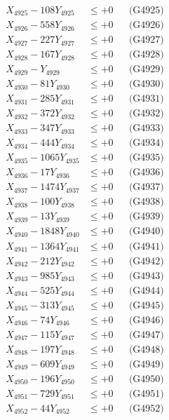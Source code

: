 \documentclass[a4paper,10pt]{article}
\begin{document}
{\begin{align}
X_{4925} - 108Y_{4925} &\leq +0 && \text{(G4925)} \\
X_{4926} - 558Y_{4926} &\leq +0 && \text{(G4926)} \\
X_{4927} - 227Y_{4927} &\leq +0 && \text{(G4927)} \\
X_{4928} - 167Y_{4928} &\leq +0 && \text{(G4928)} \\
X_{4929} - Y_{4929} &\leq +0 && \text{(G4929)} \\
X_{4930} - 81Y_{4930} &\leq +0 && \text{(G4930)} \\
\allowbreak
X_{4931} - 285Y_{4931} &\leq +0 && \text{(G4931)} \\
X_{4932} - 372Y_{4932} &\leq +0 && \text{(G4932)} \\
X_{4933} - 347Y_{4933} &\leq +0 && \text{(G4933)} \\
X_{4934} - 444Y_{4934} &\leq +0 && \text{(G4934)} \\
X_{4935} - 1065Y_{4935} &\leq +0 && \text{(G4935)} \\
X_{4936} - 17Y_{4936} &\leq +0 && \text{(G4936)} \\
X_{4937} - 1474Y_{4937} &\leq +0 && \text{(G4937)} \\
X_{4938} - 100Y_{4938} &\leq +0 && \text{(G4938)} \\
X_{4939} - 13Y_{4939} &\leq +0 && \text{(G4939)} \\
X_{4940} - 1848Y_{4940} &\leq +0 && \text{(G4940)} \\
\allowbreak
X_{4941} - 1364Y_{4941} &\leq +0 && \text{(G4941)} \\
X_{4942} - 212Y_{4942} &\leq +0 && \text{(G4942)} \\
X_{4943} - 985Y_{4943} &\leq +0 && \text{(G4943)} \\
X_{4944} - 525Y_{4944} &\leq +0 && \text{(G4944)} \\
X_{4945} - 313Y_{4945} &\leq +0 && \text{(G4945)} \\
X_{4946} - 74Y_{4946} &\leq +0 && \text{(G4946)} \\
X_{4947} - 115Y_{4947} &\leq +0 && \text{(G4947)} \\
X_{4948} - 197Y_{4948} &\leq +0 && \text{(G4948)} \\
X_{4949} - 609Y_{4949} &\leq +0 && \text{(G4949)} \\
X_{4950} - 196Y_{4950} &\leq +0 && \text{(G4950)} \\
\allowbreak
X_{4951} - 729Y_{4951} &\leq +0 && \text{(G4951)} \\
X_{4952} - 44Y_{4952} &\leq +0 && \text{(G4952)} \\

\end{align}}
\end{document}
